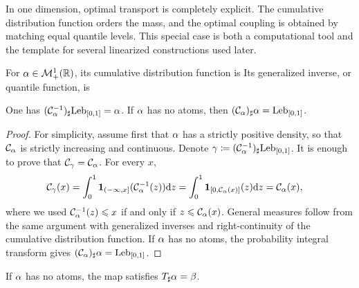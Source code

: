 In one dimension, optimal transport is completely explicit. The cumulative distribution function orders the mass, and the optimal coupling is obtained by matching equal quantile levels. This special case is both a computational tool and the template for several linearized constructions used later.

\begin{defn}\label{def-cdf-quantile}
	For $\alpha\in\mathcal{M}_+^1(\mathbb{R})$, its cumulative distribution function is
	\eql{\label{eq-cumul-defn}
		\cumul{\al}(x)\eqdef\al((-\infty,x]).
	}
	Its generalized inverse, or quantile function, is
\end{defn}

\begin{prop}\label{prop-quantile-pushforward}
	One has $(\mathcal{C}_{\alpha}^{-1})_\sharp\mathrm{Leb}_{[0,1]}=\alpha$. If $\alpha$ has no atoms, then $(\mathcal{C}_{\alpha})_\sharp\alpha=\mathrm{Leb}_{[0,1]}$.
\end{prop}
\begin{proof}
	For simplicity, assume first that $\alpha$ has a strictly positive density, so that $\mathcal{C}_{\alpha}$ is strictly increasing and continuous. Denote $\gamma\coloneqq(\mathcal{C}_{\alpha}^{-1})_\sharp\mathrm{Leb}_{[0,1]}$. It is enough to prove that $\mathcal{C}_{\gamma}=\mathcal{C}_{\alpha}$. For every $x$,
	\[
	\begin{aligned}
		\mathcal{C}_{\gamma}(x)
		&=
		\int_0^1 \mathbf 1_{(-\infty,x]}(\mathcal{C}_{\alpha}^{-1}(z))\mathrm{d} z
		=
		\int_0^1 \mathbf 1_{[0,\mathcal{C}_{\alpha}(x)]}(z)\mathrm{d} z
		=
		\mathcal{C}_{\alpha}(x),
	\end{aligned}
	\]
	where we used $\mathcal{C}_{\alpha}^{-1}(z)\leqslant x$ if and only if $z\leqslant\mathcal{C}_{\alpha}(x)$. General measures follow from the same argument with generalized inverses and right-continuity of the cumulative distribution function. If $\alpha$ has no atoms, the probability integral transform gives $(\mathcal{C}_{\alpha})_\sharp\alpha=\mathrm{Leb}_{[0,1]}$.
\end{proof}

If $\alpha$ has no atoms, the map
satisfies $T_\sharp\alpha=\beta$.

